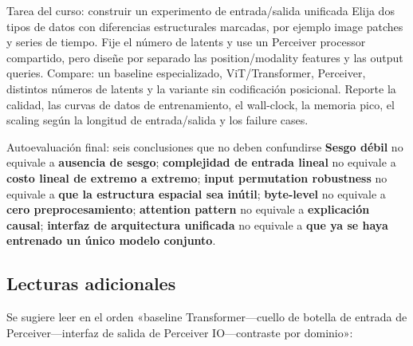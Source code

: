 \documentclass[a4paper]{article}
\begin{document}
\begin{importantbox}{Tarea del curso: construir un experimento de entrada/salida unificada}
Elija dos tipos de datos con diferencias estructurales marcadas, por ejemplo image patches y series de tiempo. Fije el número de latents y use un Perceiver processor compartido, pero diseñe por separado las position/modality features y las output queries. Compare: un baseline especializado, ViT/Transformer, Perceiver, distintos números de latents y la variante sin codificación posicional. Reporte la calidad, las curvas de datos de entrenamiento, el wall-clock, la memoria pico, el scaling según la longitud de entrada/salida y los failure cases.
\end{importantbox}

\begin{warningbox}{Autoevaluación final: seis conclusiones que no deben confundirse}
\textbf{Sesgo débil} no equivale a \textbf{ausencia de sesgo}; \textbf{complejidad de entrada lineal} no equivale a \textbf{costo lineal de extremo a extremo}; \textbf{input permutation robustness} no equivale a \textbf{que la estructura espacial sea inútil}; \textbf{byte-level} no equivale a \textbf{cero preprocesamiento}; \textbf{attention pattern} no equivale a \textbf{explicación causal}; \textbf{interfaz de arquitectura unificada} no equivale a \textbf{que ya se haya entrenado un único modelo conjunto}.
\end{warningbox}

\subsection{Lecturas adicionales}

Se sugiere leer en el orden «baseline Transformer—cuello de botella de entrada de Perceiver—interfaz de salida de Perceiver IO—contraste por dominio»:
\end{document}
